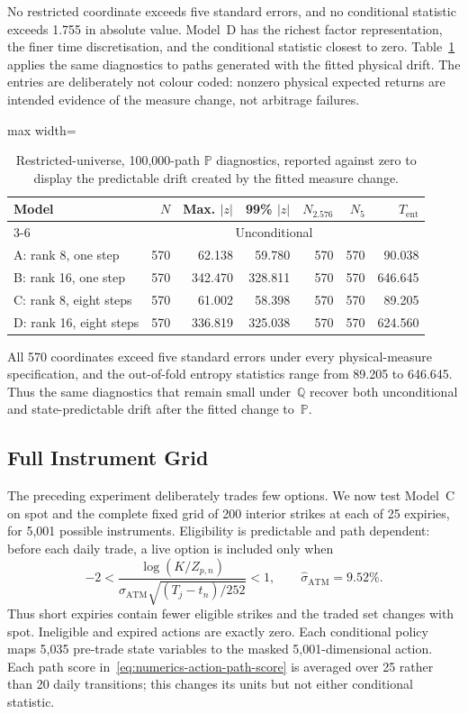 \documentclass[11pt]{article}
\newcommand{\Q}{\mathbb Q}
\newcommand{\PP}{\mathbb P}
\newcommand{\abs}[1]{\lvert #1\rvert}
\theoremstyle{plain}
\theoremstyle{definition}
\theoremstyle{remark}
\begin{document}
No restricted coordinate exceeds five standard errors, and no conditional
statistic exceeds 1.755 in absolute value.  Model~D has the richest
factor representation, the finer time discretisation, and the conditional
statistic closest to zero.  Table~\ref{tab:numerics-restricted-p} applies the
same diagnostics to paths generated with the fitted physical drift.  The
entries are deliberately not colour coded: nonzero physical expected returns
are intended evidence of the measure change, not arbitrage failures.

\begin{table}[H]
\centering
\small
\begin{adjustbox}{max width=\textwidth}
\begin{tabular}{lrrrrrr}
\toprule
Model & $N$ & Max. $\abs{z}$ & 99\% $\abs{z}$
& $N_{2.576}$ & $N_5$ & $T_{\mathrm{ent}}$\\
\cmidrule(lr){3-6}
& & \multicolumn{4}{c}{Unconditional} & \\
\midrule
A: rank 8, one step    & 570 & 62.138 & 59.780 & 570 & 570 & 90.038\\
B: rank 16, one step   & 570 & 342.470 & 328.811 & 570 & 570 & 646.645\\
C: rank 8, eight steps & 570 & 61.002 & 58.398 & 570 & 570 & 89.205\\
D: rank 16, eight steps& 570 & 336.819 & 325.038 & 570 & 570 & 624.560\\
\bottomrule
\end{tabular}
\end{adjustbox}
\caption{Restricted-universe, 100,000-path $\PP$ diagnostics, reported against
zero to display the predictable drift created by the fitted
measure change.}
\label{tab:numerics-restricted-p}
\end{table}

All 570 coordinates exceed five standard errors under every physical-measure
specification, and the out-of-fold entropy statistics range from 89.205 to
646.645.  Thus the same diagnostics that remain small under~$\Q$ recover both
unconditional and state-predictable drift after the fitted change to~$\PP$.

\subsection{Full Instrument Grid}
\label{sec:numerics-full-instrument-grid}

The preceding experiment deliberately trades few options.  We now test
Model~C on spot and the complete fixed grid of 200 interior strikes at each of
25 expiries, for 5,001 possible instruments.  Eligibility is predictable and
path dependent: before each daily trade, a live option is included only when
\[
-2 < \frac{\log(K/Z_{p,n})}
{\widehat\sigma_{\mathrm{ATM}}\sqrt{(T_j-t_n)/252}} < 1,
\qquad \widehat\sigma_{\mathrm{ATM}}=9.52\%.
\]
Thus short expiries contain fewer eligible strikes and the traded set changes
with spot.  Ineligible and expired actions are exactly zero.  Each conditional
policy maps 5,035 pre-trade state variables to the masked 5,001-dimensional
action.  Each path score in~\eqref{eq:numerics-action-path-score} is averaged
over 25 rather than 20 daily transitions; this changes its units but not either
conditional statistic.
\end{document}
